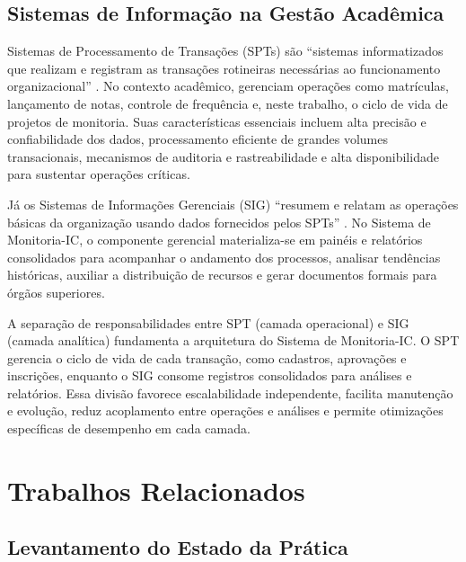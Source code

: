 \documentclass[portuguese]{sbc2025}%
\begin{document}
\subsection{Sistemas de Informação na Gestão Acadêmica}

Sistemas de Processamento de Transações (SPTs) são “sistemas informatizados que realizam e registram as transações rotineiras necessárias ao funcionamento organizacional” \cite{Laudon_Laudon_2011}. No contexto acadêmico, gerenciam operações como matrículas, lançamento de notas, controle de frequência e, neste trabalho, o ciclo de vida de projetos de monitoria. Suas características essenciais incluem alta precisão e confiabilidade dos dados, processamento eficiente de grandes volumes transacionais, mecanismos de auditoria e rastreabilidade e alta disponibilidade para sustentar operações críticas.

Já os Sistemas de Informações Gerenciais (SIG) “resumem e relatam as operações básicas da organização usando dados fornecidos pelos SPTs” \cite{Laudon_Laudon_2011}. No Sistema de Monitoria-IC, o componente gerencial materializa-se em painéis e relatórios consolidados para acompanhar o andamento dos processos, analisar tendências históricas, auxiliar a distribuição de recursos e gerar documentos formais para órgãos superiores.

A separação de responsabilidades entre SPT (camada operacional) e SIG (camada analítica) fundamenta a arquitetura do Sistema de Monitoria-IC. O SPT gerencia o ciclo de vida de cada transação, como cadastros, aprovações e inscrições, enquanto o SIG consome registros consolidados para análises e relatórios. Essa divisão favorece escalabilidade independente, facilita manutenção e evolução, reduz acoplamento entre operações e análises e permite otimizações específicas de desempenho em cada camada.


\section{Trabalhos Relacionados}
\label{sec:related-work}


\subsection{Levantamento do Estado da Prática}
\end{document}
